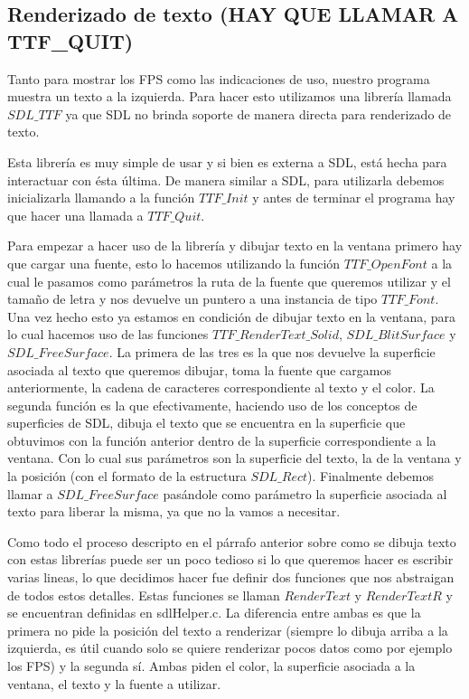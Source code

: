 \documentclass[a4paper]{article}
\newcounter{col}
\begin{document}
\subsection{Renderizado de texto (HAY QUE LLAMAR A TTF_QUIT)}
Tanto para mostrar los FPS como las indicaciones de uso, nuestro programa muestra un texto a la izquierda. Para hacer esto utilizamos una librería llamada $SDL\_TTF$ ya que SDL no brinda soporte de manera directa para renderizado de texto.
\par Esta librería es muy simple de usar y si bien es externa a SDL, está hecha para interactuar con ésta última. De manera similar a SDL, para utilizarla debemos inicializarla llamando a la función $TTF\_Init$ y antes de terminar el programa hay que hacer una llamada a $TTF\_Quit$.
\par Para empezar a hacer uso de la librería y dibujar texto en la ventana primero hay que cargar una fuente, esto lo hacemos utilizando la función $TTF\_OpenFont$ a la cual le pasamos como parámetros la ruta de la fuente que queremos utilizar y el tamaño de letra y nos devuelve un puntero a una instancia de tipo $TTF\_Font$. Una vez hecho esto ya estamos en condición de dibujar texto en la ventana, para lo cual hacemos uso de las funciones $TTF\_RenderText\_Solid$, $SDL\_BlitSurface$ y $SDL\_FreeSurface$. La primera de las tres es la que nos devuelve la superficie asociada al texto que queremos dibujar, toma la fuente que cargamos anteriormente, la cadena de caracteres correspondiente al texto y el color. La segunda función es la que efectivamente, haciendo uso de los conceptos de superficies de SDL, dibuja el texto que se encuentra en la superficie que obtuvimos con la función anterior dentro de la superficie correspondiente a la ventana. Con lo cual sus parámetros son la superficie del texto, la de la ventana y la posición (con el formato de la estructura $SDL\_Rect$). Finalmente debemos llamar a $SDL\_FreeSurface$ pasándole como parámetro la superficie asociada al texto para liberar la misma, ya que no la vamos a necesitar.
\par Como todo el proceso descripto en el párrafo anterior sobre como se dibuja texto con estas librerías puede ser un poco tedioso si lo que queremos hacer es escribir varias lineas, lo que decidimos hacer fue definir dos funciones que nos abstraigan de todos estos detalles. Estas funciones se llaman $RenderText$ y $RenderTextR$ y se encuentran definidas en sdlHelper.c. La diferencia entre ambas es que la primera no pide la posición del texto a renderizar (siempre lo dibuja arriba a la izquierda, es útil cuando solo se quiere renderizar pocos datos como por ejemplo los FPS) y la segunda sí. Ambas piden el color, la superficie asociada a la ventana, el texto y la fuente a utilizar.
\end{document}
